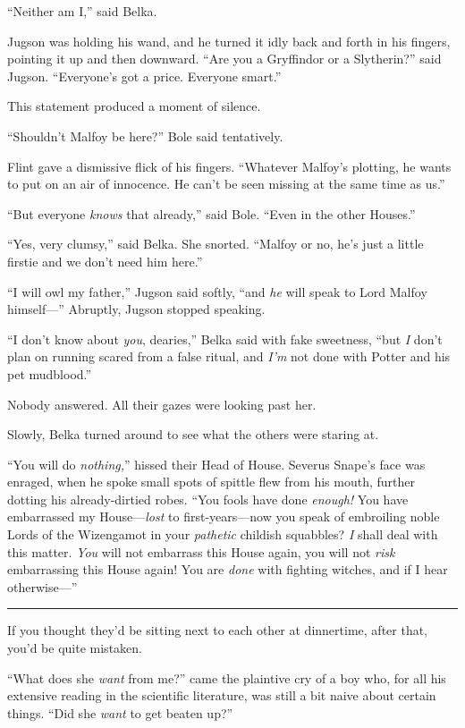 ``Neither am I,'' said Belka.

Jugson was holding his wand, and he turned it idly back and forth in his
fingers, pointing it up and then downward. ``Are you a Gryffindor or a
Slytherin?'' said Jugson. ``Everyone's got a price. Everyone smart.''

This statement produced a moment of silence.

``Shouldn't Malfoy be here?'' Bole said tentatively.

Flint gave a dismissive flick of his fingers. ``Whatever Malfoy's
plotting, he wants to put on an air of innocence. He can't be seen
missing at the same time as us.''

``But everyone \emph{knows} that already,'' said Bole. ``Even in the
other Houses.''

``Yes, very clumsy,'' said Belka. She snorted. ``Malfoy or no, he's just
a little firstie and we don't need him here.''

``I will owl my father,'' Jugson said softly, ``and \emph{he} will speak
to Lord Malfoy himself---'' Abruptly, Jugson stopped speaking.

``I don't know about \emph{you}, dearies,'' Belka said with fake
sweetness, ``but \emph{I} don't plan on running scared from a false
ritual, and \emph{I'm} not done with Potter and his pet mudblood.''

Nobody answered. All their gazes were looking past her.

Slowly, Belka turned around to see what the others were staring at.

``You will do \emph{nothing,}'' hissed their Head of House. Severus
Snape's face was enraged, when he spoke small spots of spittle flew from
his mouth, further dotting his already-dirtied robes. ``You fools have
done \emph{enough!} You have embarrassed my House---\emph{lost} to
first-years---now you speak of embroiling noble Lords of the Wizengamot
in your \emph{pathetic} childish squabbles? \emph{I} shall deal with
this matter. \emph{You} will not embarrass this House again, you will
not \emph{risk} embarrassing this House again! You are \emph{done} with
fighting witches, and if I hear otherwise---''

\begin{center}\rule{3in}{0.4pt}\end{center}

If you thought they'd be sitting next to each other at dinnertime, after
that, you'd be quite mistaken.

``What does she \emph{want} from me?'' came the plaintive cry of a boy
who, for all his extensive reading in the scientific literature, was
still a bit naive about certain things. ``Did she \emph{want} to get
beaten up?''

